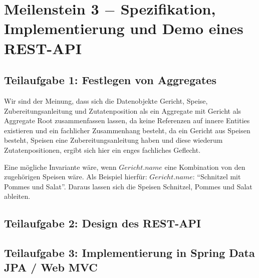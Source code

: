 \section{Meilenstein 3 $-$ Spezifikation, Implementierung und Demo
  eines REST-API}

\subsection{Teilaufgabe 1: Festlegen von Aggregates}



Wir sind der Meinung, dass sich die Datenobjekte Gericht,
Speise, Zubereitungsanleitung und Zutatenposition als ein
Aggregate mit Gericht als Aggregate Root zusammenfassen
lassen, da keine Referenzen auf innere Entities existieren
und ein fachlicher Zusammenhang besteht, da ein Gericht aus
Speisen besteht, Speisen eine Zubereitungsanleitung haben
und diese wiederum Zutatenpositionen, ergibt sich hier
ein enges fachliches Geflecht.

Eine m\"ogliche Invariante w\"are, wenn $Gericht.name$ eine
Kombination von den zugeh\"origen Speisen w\"are. Als Beispiel
hierf\"ur: $Gericht.name$: "`Schnitzel mit Pommes und Salat"'.
Daraus lassen sich die Speisen Schnitzel, Pommes und Salat
ableiten.

\subsection{Teilaufgabe 2: Design des REST-API}


\subsection{Teilaufgabe 3: Implementierung in Spring Data JPA /
  Web MVC}

